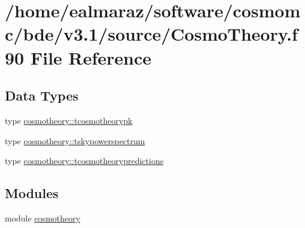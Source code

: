 \hypertarget{CosmoTheory_8f90}{}\section{/home/ealmaraz/software/cosmomc/bde/v3.1/source/\+Cosmo\+Theory.f90 File Reference}
\label{CosmoTheory_8f90}
\subsection*{Data Types}
\begin{DoxyCompactItemize}
\item 
type \mbox{\hyperlink{structcosmotheory_1_1tcosmotheorypk}{cosmotheory\+::tcosmotheorypk}}
\item 
type \mbox{\hyperlink{structcosmotheory_1_1tskypowerspectrum}{cosmotheory\+::tskypowerspectrum}}
\item 
type \mbox{\hyperlink{structcosmotheory_1_1tcosmotheorypredictions}{cosmotheory\+::tcosmotheorypredictions}}
\end{DoxyCompactItemize}
\subsection*{Modules}
\begin{DoxyCompactItemize}
\item 
module \mbox{\hyperlink{namespacecosmotheory}{cosmotheory}}
\end{DoxyCompactItemize}
